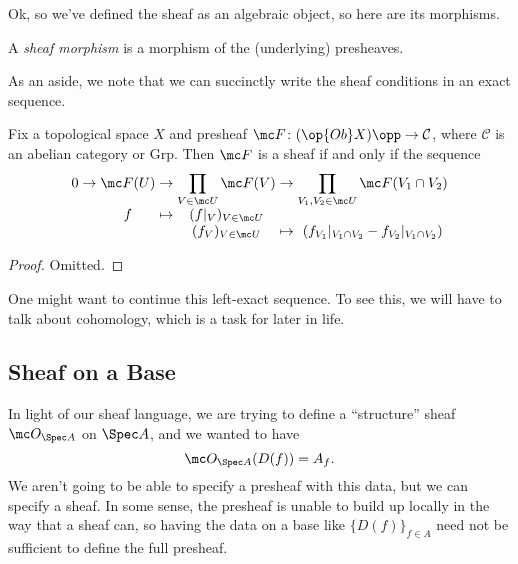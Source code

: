 \documentclass[../notes.tex]{subfiles}
\begin{document}
Ok, so we've defined the sheaf as an algebraic object, so here are its morphisms.
\begin{definition}
	A \textit{sheaf morphism} is a morphism of the (underlying) presheaves.
\end{definition}
As an aside, we note that we can succinctly write the sheaf conditions in an exact sequence.
\begin{lemma}
	Fix a topological space $X$ and presheaf $\mc F\colon(\op{Ob}X)\opp\to\mathcal C$, where $\mathcal C$ is an abelian category or $\mathrm{Grp}$. Then $\mc F$ is a sheaf if and only if the sequence
	\[\arraycolsep=1.4pt\begin{array}{cccccccccccc}
		0 &\to& \mc F(U) &\to& \displaystyle\prod_{V\in\mc U}\mc F(V) &\to& \displaystyle\prod_{V_1,V_2\in\mc U}\mc F(V_1\cap V_2) \\
		  &   & f        &\mapsto& (f|_V)_{V\in\mc U} \\
		  &   &          &       & (f_V)_{V\in\mc U} &\mapsto& (f_{V_1}|_{V_1\cap V_2}-f_{V_2}|_{V_1\cap V_2})
	\end{array}\]
\end{lemma}
\begin{proof}
	Omitted.
\end{proof}
\begin{remark}
	One might want to continue this left-exact sequence. To see this, we will have to talk about cohomology, which is a task for later in life.
\end{remark}

\subsection{Sheaf on a Base}
In light of our sheaf language, we are trying to define a ``structure'' sheaf $\mc O_{\Spec A}$ on $\Spec A$, and we wanted to have
\[\mc O_{\Spec A}(D(f))=A_f.\]
We aren't going to be able to specify a presheaf with this data, but we can specify a sheaf. In some sense, the presheaf is unable to build up locally in the way that a sheaf can, so having the data on a base like $\{D(f)\}_{f\in A}$ need not be sufficient to define the full presheaf.
\end{document}
